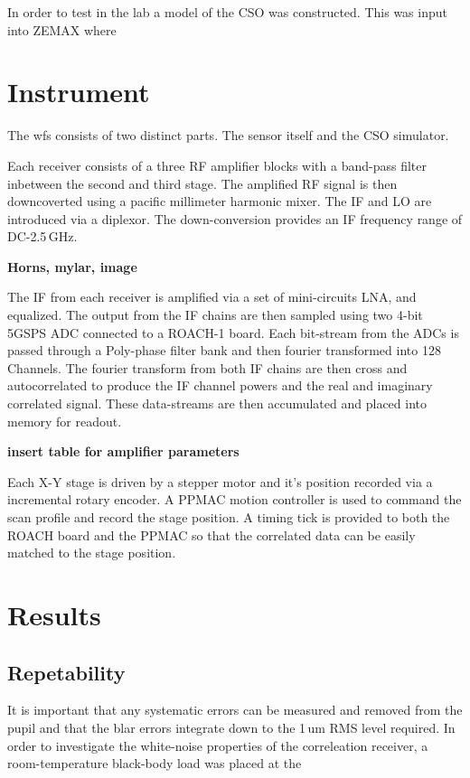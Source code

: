 \documentclass[osajnl,twocolumn,showpacs,superscriptaddress,11pt]{revtex4-1} %
\begin{document}
In order to test in the lab a model of the CSO was constructed. This was input into ZEMAX where 
\section{Instrument}

The wfs consists of two distinct parts. The sensor itself and the CSO simulator.

Each receiver consists of a three RF amplifier blocks with a band-pass filter inbetween the second and third stage. The amplified RF signal is then downcoverted using a pacific millimeter harmonic mixer. The IF and LO are introduced via a diplexor.  The down-conversion provides an IF frequency range of DC-2.5\,GHz.

{\bf Horns, mylar, image}

The IF from each receiver is amplified via a set of mini-circuits LNA, and equalized.  The output from the IF chains are then sampled using two 4-bit 5GSPS ADC connected to a ROACH-1 board.  Each bit-stream from the ADCs is passed through a Poly-phase filter bank and then fourier transformed into 128 Channels.  The fourier transform from both IF chains are then cross and autocorrelated to produce the IF channel powers and the real and imaginary correlated signal.    These data-streams are then accumulated and placed into memory for readout.  

{\bf insert table for amplifier parameters}

Each X-Y stage is driven by a stepper motor and it's position recorded via a incremental rotary encoder.  A PPMAC motion controller is used to command the scan profile and record the stage position.  A timing tick is provided to both the ROACH board and the PPMAC so that the correlated data can be easily matched to the stage position.

\section{Results}

\subsection{Repetability}

It is important that any systematic errors can be measured and removed from the pupil and that the blar errors integrate down to the 1\,um RMS level required. In order to investigate the white-noise properties of the correleation receiver, a room-temperature black-body load was placed at the 
\end{document}
